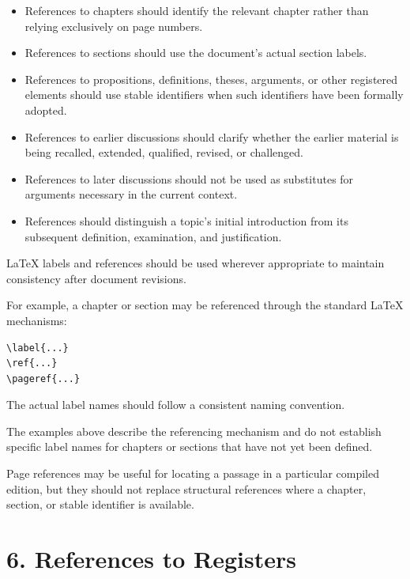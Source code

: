 \begin{itemize}
    \item References to chapters should identify
    the relevant chapter rather than relying
    exclusively on page numbers.
    \item References to sections should use
    the document's actual section labels.
    \item References to propositions, definitions,
    theses, arguments, or other registered elements
    should use stable identifiers when such
    identifiers have been formally adopted.
    \item References to earlier discussions should
    clarify whether the earlier material is being
    recalled, extended, qualified, revised, or
    challenged.
    \item References to later discussions should
    not be used as substitutes for arguments
    necessary in the current context.
    \item References should distinguish a topic's
    initial introduction from its subsequent
    definition, examination, and justification.
\end{itemize}

LaTeX labels and references should be used wherever
appropriate to maintain consistency after document
revisions.

For example, a chapter or section may be referenced
through the standard LaTeX mechanisms:

\begin{verbatim}
\label{...}
\ref{...}
\pageref{...}
\end{verbatim}

The actual label names should follow a consistent
naming convention.

The examples above describe the referencing
mechanism and do not establish specific label
names for chapters or sections that have not
yet been defined.

Page references may be useful for locating
a passage in a particular compiled edition,
but they should not replace structural references
where a chapter, section, or stable identifier
is available.


\section*{6. References to Registers}

